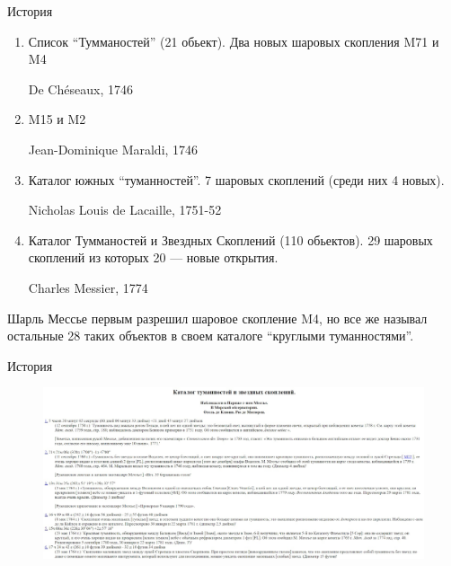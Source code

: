 \documentclass{beamer}
\begin{document}
    \begin{frame}{История}
                    \begin{enumerate}[]
                        \item Список ``Тумманостей'' (21 обьект)\cite{list21}. Два новых шаровых скопления M71 и M4 \par De Chéseaux, 1746
                        \item M15 и M2 \par Jean-Dominique Maraldi, 1746 
                        \item Каталог южных ``туманностей''. 7 шаровых скоплений (среди них 4 новых). \par Nicholas Louis de Lacaille, 1751-52
                        \item Каталог Тумманостей и Звездных Скоплений (110 обьектов). 29 шаровых скоплений из которых 20 --- новые открытия. \par Charles Messier, 1774
                    \end{enumerate}
                    Шарль Мессье первым разрешил шаровое скопление M4, но все же называл остальные 28 таких объектов в своем каталоге ``круглыми туманностями''.
    \end{frame}
    \begin{frame}{История}
        \begin{figure}
            \centering
                \includegraphics[width=0.9\linewidth]{pictures/Messie.jpg}
            \end{figure}
    \end{frame}
\end{document}
